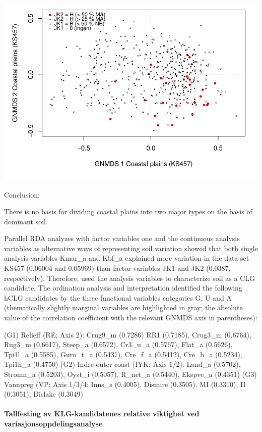 \documentclass[]{article}
\let\oldparagraph\paragraph
\renewcommand{\paragraph}[1]{\oldparagraph{#1}\mbox{}}
\begin{document}
\includegraphics{Landscape_analysis_example_4_files/figure-latex/unnamed-chunk-15-1.pdf}

Conclusion:

There is no basis for dividing coastal plains into two major types on
the basis of dominant soil.

Parallel RDA analyzes with factor variables one and the continuous
analysis variables as alternative ways of representing soil variation
showed that both single analysis variables Kmar\_a and Kbf\_a explained
more variation in the data set KS457 (0.06004 and 0.05969) than factor
variables JK1 and JK2 (0.0387, respectively). Therefore, used the
analysis variables to characterize soil as a CLG candidate. The
ordination analysis and interpretation identified the following hCLG
candidates by the three functional variables categories G, U and A
(thematically slightly marginal variables are highlighted in gray; the
absolute value of the correlation coefficient with the relevant GNMDS
axis in parentheses):

(G1) Relieff (RE; Axis 2): Crug9\_m (0.7286) RR1 (0.7185), Crug3\_m
(0.6764), Rug3\_m (0.6617), Steep\_a (0.6572), Cr3\_u\_a (0.5767),
Flat\_a (0.5626), Tpi1l\_a (0.5585), Guro\_t\_a (0.5437), Cre\_f\_a
(0.5412), Cre\_b\_a (0.5234), Tpi1h\_a (0.4750) (G2) Indre-outer coast
(IYK; Axis 1/2): Land\_a (0.5702), Stromn\_a (0.5203), Oyst\_i (0.5057),
R\_net\_a (0.5440), Ekspve\_a (0.4351) (G3) Vannpreg (VP; Axis 1/3/4:
Inns\_s (0.4005), Dismire (0.3505), MI (0.3310), II (0.3051), Dislake
(0.3049)

\hypertarget{tallfesting-av-klg-kandidatenes-relative-viktighet-ved-variasjonsoppdelingsanalyse}{%
\paragraph{Tallfesting av KLG-kandidatenes relative viktighet ved
variasjonsoppdelingsanalyse}\label{tallfesting-av-klg-kandidatenes-relative-viktighet-ved-variasjonsoppdelingsanalyse}}
\end{document}
